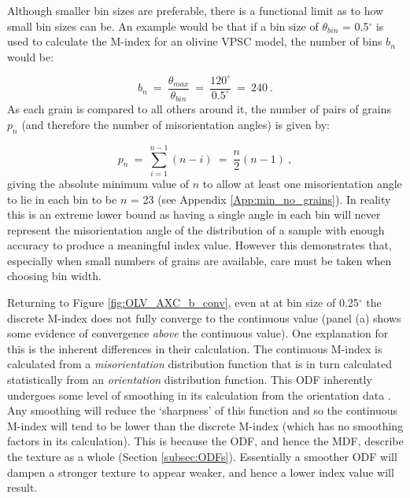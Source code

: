 \documentclass[a4paper,12pt,twoside]{report}
\numberwithin{equation}{chapter}
\begin{document}
Although smaller bin sizes are preferable, there is a functional limit as to how small bin sizes can be. An example would be that if a bin size of $\theta_{bin}$ = 0.5$^\circ$ is used to calculate the M-index for an olivine VPSC model, the number of bins $b_n$ would be:

\begin{equation}
b_n\ =\ \frac{\theta_{max}}{\theta_{bin}}\ =\ \frac{120^\circ}{0.5^\circ}\ =\ 240\ . 
\end{equation}     
\noindent
As each grain is compared to all others around it, the number of pairs of grains $p_n$ (and therefore the number of misorientation angles) is given by:

\begin{equation}
p_n\ =\ \sum^{n-1}_{i=1}(n - i)\ =\ \frac{n}{2}(n-1)\ ,
\end{equation} 
\noindent
giving the absolute minimum value of $n$ to allow at least one misorientation angle to lie in each bin to be $n$ = 23 (see Appendix \ref{App:min_no_grains}). In reality this is an extreme lower bound as having a single angle in each bin will never represent the misorientation angle of the distribution of a sample with enough accuracy to produce a meaningful index value. However this demonstrates that, especially when small numbers of grains are available, care must be taken when choosing bin width. 

Returning to Figure \ref{fig:OLV_AXC_b_conv}, even at at bin size of 0.25$^\circ$ the discrete M-index does not fully converge to the continuous value (panel (a) shows some evidence of convergence \emph{above} the continuous value). One explanation for this is the inherent differences in their calculation. The continuous M-index is calculated from a \emph{misorientation} distribution function that is in turn calculated statistically from an \emph{orientation} distribution function. This ODF inherently undergoes some level of smoothing in its calculation from the orientation data \citep[e.g. regularisation when inverting for the ODF in the \texttt{MTEX} algorithm, see][]{Hielscher2008}. Any smoothing will reduce the \lq{}sharpness\rq{} of this function and so the continuous M-index will tend to be lower than the discrete M-index (which has no smoothing factors in its calculation). This is because the ODF, and hence the MDF, describe the texture as a whole (Section \ref{subsec:ODFs}). Essentially a smoother ODF will dampen a stronger texture to appear weaker, and hence a lower index value will result. 
\end{document}
